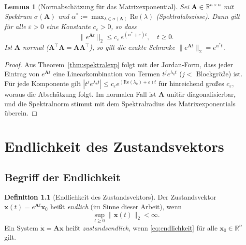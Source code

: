 ﻿\documentclass[12pt, a4paper, titlepage]{report}
\newtheorem{lemma}[theorem]{Lemma}
\theoremstyle{definition}
\newtheorem{definition}[theorem]{Definition}
\theoremstyle{remark}
\newcommand{\R}{\mathbb{R}}
\newcommand{\vx}{\bm{x}}
\newcommand{\vA}{\bm{A}}
\newcommand{\T}{\top}
\newcommand{\spec}{\sigma}
\newcommand{\re}{\mathrm{Re}}
\begin{document}
\begin{lemma}[Normabschätzung für das Matrixexponential]
\label{lem:normbound}
Sei $\vA \in \R^{n \times n}$ mit Spektrum $\spec(\vA)$ und
$\alpha^* := \max_{\lambda \in \spec(\vA)} \re(\lambda)$ (Spektralabszisse).
Dann gilt für alle $\varepsilon > 0$ eine Konstante $c_\varepsilon > 0$, so dass
\begin{equation}
  \|e^{\vA t}\|_2 \leq c_\varepsilon\, e^{(\alpha^* + \varepsilon)t}, \quad t \geq 0.
  \label{eq:normbound}
\end{equation}
Ist $\vA$ normal ($\vA^\T\vA = \vA\vA^\T$), so gilt die exakte Schranke
$\|e^{\vA t}\|_2 = e^{\alpha^* t}$.
\end{lemma}

\begin{proof}
Aus Theorem~\ref{thm:spektralexp} folgt mit der Jordan-Form, dass jeder Eintrag von
$e^{\vA t}$ eine Linearkombination von Termen $t^j e^{\lambda_k t}$ ($j < $ Blockgröße)
ist. Für jede Komponente gilt $|t^j e^{\lambda_k t}| \leq c_\varepsilon e^{(\re(\lambda_k)+\varepsilon)t}$
für hinreichend großes $c_\varepsilon$, woraus die Abschätzung folgt. Im normalen Fall
ist $\vA$ unitär diagonalisierbar, und die Spektralnorm stimmt mit dem Spektralradius
des Matrixexponentials überein. \qedhere
\end{proof}

\chapter{Endlichkeit des Zustandsvektors}
\label{sec:endlichkeit}

\section{Begriff der Endlichkeit}

\begin{definition}[Endlichkeit des Zustandsvektors]
\label{def:endlichkeit}
Der Zustandsvektor $\vx(t) = e^{\vA t}\vx_0$ heißt \emph{endlich} (im Sinne dieser
Arbeit), wenn
\begin{equation}
  \sup_{t \geq 0} \|\vx(t)\|_2 < \infty.
  \label{eq:endlichkeit}
\end{equation}
Ein System $\dot{\vx} = \vA\vx$ heißt \emph{zustandsendlich}, wenn
\eqref{eq:endlichkeit} für alle $\vx_0 \in \R^n$ gilt.
\end{definition}
\end{document}
